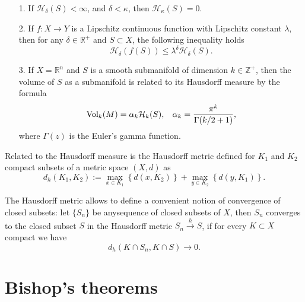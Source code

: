 \documentclass[12pt,twoside,a4paper]{report}
\newcommand{\zah}{\ensuremath{ \mathbb Z }}
\newcommand{\re}{\ensuremath{\mathbb R }}
\begin{document}
\begin{enumerate}
        \item[1.] If $\mathcal{H}_{\delta}(S)<\infty$, and $\delta<\kappa$, then $\mathcal{H}_{\kappa}(S)=0$.\\

        \item[2.] If $f:X\rightarrow Y$ is a Lipschitz continuous function with
        Lipschitz constant $\lambda$, then for any $\delta\in\re^{+}$ and
        $S\subset X$, the following inequality holds
        \[
        \mathcal{H}_{\delta}(f(S))\leq\lambda^{\delta}\mathcal{H}_{\delta}(S).
        \]
        \item[3.]If $X=\re^{n}$ and $S$ is a smooth submanifold of dimension
        $k\in\zah^{+}$, then the volume of $S$ as a submanifold is related to
        its Hausdorff measure by the formula
        \[
        \textrm{Vol}_{k}(M)=\alpha_{k}\mathcal{H}_k(S),\hspace*{0.3cm}\alpha_k= \frac{\pi^k}{\Gamma(k/2+1)},
        \]
\noindent where $\Gamma(z)$ is the Euler's gamma function.
\end{enumerate}

Related to the Hausdorff measure is the Hausdorff metric defined for $K_1$
and $K_2$ compact subsets of a metric space $(X,d)$ as $$
d_h(K_1,K_2):= \max_{x\in K_1}\left\{d(x,K_2)\right\}+\max_{y\in K_2}\left\{d(y,K_1)\right\}.$$

The Hausdorff metric allows to define a convenient notion of convergence of closed subsets: let $\{S_n \}$ be anysequence of closed subsets of $X$, then $S_n$ converges to the closed subset $S$ in the Hausdorff metric $S_n\overset{h}\rightarrow S$, if for every $K\subset X$ compact we have
\[
  d_h(K\cap S_n,K\cap S)\rightarrow 0.
\]
\section{Bishop's theorems}
\end{document}
